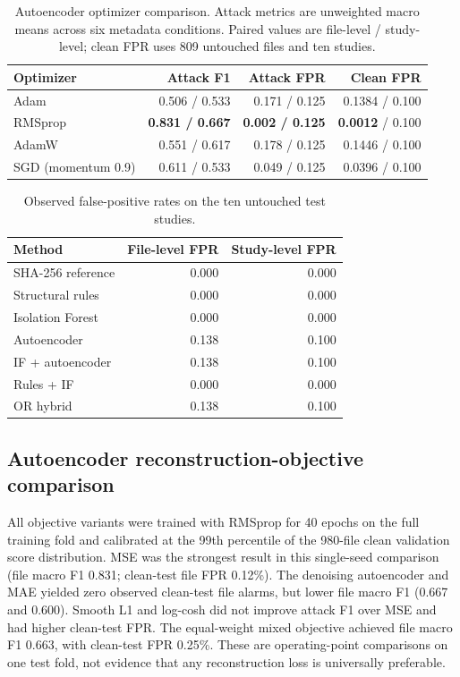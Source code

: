 \documentclass[journal]{IEEEtran}
\begin{document}
\begin{table}[H]
\caption{Autoencoder optimizer comparison. Attack metrics are unweighted macro means across six metadata conditions. Paired values are file-level / study-level; clean FPR uses 809 untouched files and ten studies.}
  \label{tab:ae_optimizers}
  \centering\scriptsize
\setlength{\tabcolsep}{4pt}
\begin{tabular}{lrrr}
  \toprule
Optimizer & Attack F1 & Attack FPR & Clean FPR \\
  \midrule
Adam & 0.506 / 0.533 & 0.171 / 0.125 & 0.1384 / 0.100 \\
RMSprop & \textbf{0.831 / 0.667} & \textbf{0.002 / 0.125} & \textbf{0.0012} / 0.100 \\
AdamW & 0.551 / 0.617 & 0.178 / 0.125 & 0.1446 / 0.100 \\
SGD (momentum 0.9) & 0.611 / 0.533 & 0.049 / 0.125 & 0.0396 / 0.100 \\
  \bottomrule
  \end{tabular}
\end{table}
  
  \begin{table}[t]
  \caption{Observed false-positive rates on the ten untouched test studies.}
  \label{tab:cleanfpr}
  \centering\footnotesize
  \begin{tabular}{lrr}
  \toprule
  Method & File-level FPR & Study-level FPR \\
  \midrule
  SHA-256 reference & 0.000 & 0.000 \\
  Structural rules & 0.000 & 0.000 \\
  Isolation Forest & 0.000 & 0.000 \\
  Autoencoder & 0.138 & 0.100 \\
  IF + autoencoder & 0.138 & 0.100 \\
  Rules + IF & 0.000 & 0.000 \\
  OR hybrid & 0.138 & 0.100 \\
  \bottomrule
  \end{tabular}
  \end{table}
  
  \subsection{Autoencoder reconstruction-objective comparison}
  All objective variants were trained with RMSprop for 40 epochs on the full training fold and calibrated at the 99th percentile of the 980-file clean validation score distribution. MSE was the strongest result in this single-seed comparison (file macro F1 0.831; clean-test file FPR 0.12\%). The denoising autoencoder and MAE yielded zero observed clean-test file alarms, but lower file macro F1 (0.667 and 0.600). Smooth L1 and log-cosh did not improve attack F1 over MSE and had higher clean-test FPR. The equal-weight mixed objective achieved file macro F1 0.663, with clean-test FPR 0.25\%. These are operating-point comparisons on one test fold, not evidence that any reconstruction loss is universally preferable.
\end{document}
